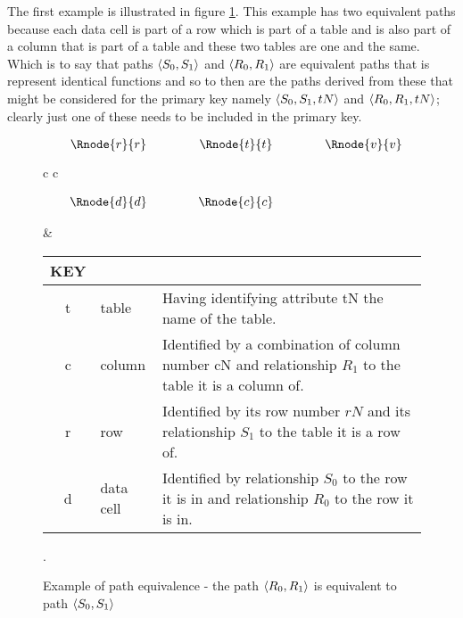 \documentclass[10pt,a4paper]{article}
\begin{document}
The first example is illustrated in figure
\ref{datatablegraph}. This example has two equivalent paths because 
each data cell is part of a row which is part of a table and is also part 
of a column that is part of a table and these two tables are one and the same.
Which is to say that paths $\langle S_0,S_1\rangle$ and $\langle R_0,R_1\rangle$ are equivalent 
paths that is represent identical functions and so to then are the paths
derived from these that might be considered for the primary key namely
$\langle S_0,S_1,tN\rangle$ and $\langle R_0,R_1,tN\rangle$; clearly just one of these needs
to be included in the primary key. 
\begin{figure} [h] %
\begin{center}
\begin{tabular}{c c}
$
\begin{array}{cp{0.75cm}cp{0.75cm}c}
   \Rnode{r}{r}     & & \Rnode{t}{t} & & \Rnode{v}{v} \\[1.2cm]     
	 \Rnode{d}{d}   & & \Rnode{c}{c} & &               
\end{array}
$
\idcomp
{} 
\idcomp
{} 
\idcomp
{}
\idcomp
{}
\idcomp
{}
\idcomp
{}
\idcomp

& \footnotesize
\begin{tabular}{c p{1.5cm} p{4cm}}
KEY && \\
\hline
t & table & Having identifying attribute tN the name of the table. \\
c & column & Identified by a combination of column number cN and relationship $R_1$ to the table it is a column of.\\
r & row & Identified by its row number $rN$ and its relationship $S_1$ to the table it is a row of.\\
d & data cell & Identified by relationship $S_0$ to the row it is in and relationship $R_0$ to the row it is in. \\
\end{tabular} 
\end{tabular}
\end{center}
\caption{Example of path equivalence - the path $\langle R_0,R_1\rangle$ is equivalent to path $\langle S_0,S_1\rangle$}.
\label{datatablegraph}
\end{figure}
\end{document}
